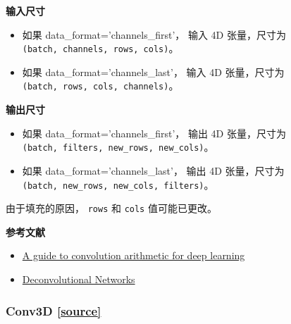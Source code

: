 \textbf{输入尺寸}

\begin{itemize}
\tightlist
\item
  如果 data\_format='channels\_first'， 输入 4D 张量，尺寸为
  \texttt{(batch,\ channels,\ rows,\ cols)}。
\item
  如果 data\_format='channels\_last'， 输入 4D 张量，尺寸为
  \texttt{(batch,\ rows,\ cols,\ channels)}。
\end{itemize}

\textbf{输出尺寸}

\begin{itemize}
\tightlist
\item
  如果 data\_format='channels\_first'， 输出 4D 张量，尺寸为
  \texttt{(batch,\ filters,\ new\_rows,\ new\_cols)}。
\item
  如果 data\_format='channels\_last'， 输出 4D 张量，尺寸为
  \texttt{(batch,\ new\_rows,\ new\_cols,\ filters)}。
\end{itemize}

由于填充的原因， \texttt{rows} 和 \texttt{cols} 值可能已更改。

\textbf{参考文献}

\begin{itemize}
\tightlist
\item
  \href{https://arxiv.org/abs/1603.07285v1}{A guide to convolution
  arithmetic for deep learning}
\item
  \href{http://www.matthewzeiler.com/pubs/cvpr2010/cvpr2010.pdf}{Deconvolutional
  Networks}
\end{itemize}



\subsubsection{Conv3D {\href{https://github.com/keras-team/keras/blob/master/keras/layers/convolutional.py\#L471}{{[}source{]}}}}

